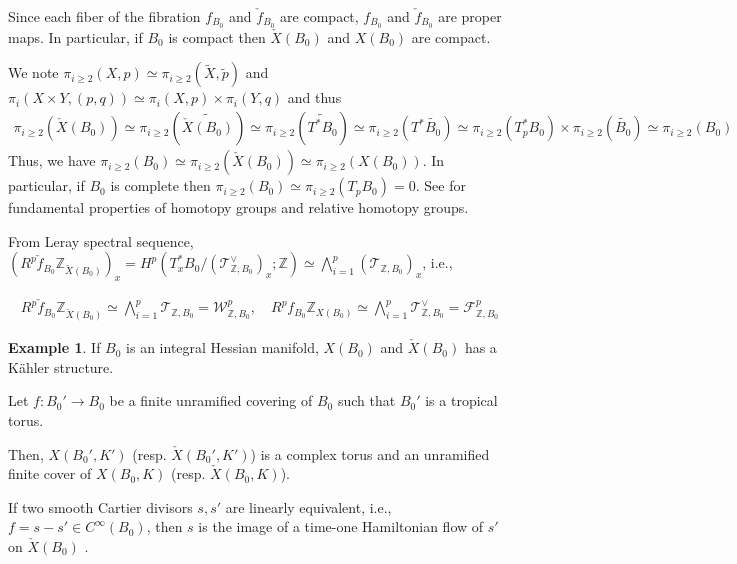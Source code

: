 \documentclass[a4paper,dvipdfmx,reqno,12pt]{amsart}
\theoremstyle{definition}
\newtheorem{Eg}[Thm]{Example}
\newcommand{\Z}{\mathbb{Z}}%
\newcommand{\mcal}[1]{\mathcal{#1}}%
\newcommand{\TBZ}{\mcal{T}_{\Z,B_0}}
\numberwithin{equation}{section}
\begin{document}
Since each fiber of the fibration $f_{B_0}$ and $\check{f}_{B_0}$ are compact, $f_{B_0}$ and $\check{f}_{B_0}$ are proper maps. In particular, if $B_0$ is compact then $\check{X}(B_0)$ and $X(B_0)$ are compact.



We note $\pi_{i\geq 2}(X,p)\simeq \pi_{i\geq 2}(\widetilde{X},\tilde{p})$ and $\pi_{i}(X\times Y,(p,q))\simeq \pi_i(X,p)\times \pi_i(Y,q)$ and thus
\begin{align}
  \pi_{i\geq 2}(\check{X}(B_0))\simeq \pi_{i\geq 2}(\widetilde{\check{X}(B_0)})\simeq \pi_{i\geq 2}(\widetilde{T^{*}B_0})\simeq \pi_{i\geq 2}(T^{*}\widetilde{B_0})\simeq  \pi_{i\geq 2}(T_p^* B_0)\times \pi_{i\geq 2}(\widetilde{B_0})\simeq \pi_{i\geq 2}(B_0)
\end{align}
Thus, we have $\pi_{i\geq 2}(B_0)\simeq \pi_{i\geq 2}(\check{X}(B_0))\simeq \pi_{i\geq 2}(X(B_0))$. In particular, if $B_0$ is complete then $\pi_{i\geq 2}(B_0)\simeq \pi_{i\geq 2}(T_{p}B_0)=0$. See \cite[Chapter 4]{hatcherAlgebraicTopology2002a} for fundamental properties of homotopy groups and relative homotopy groups.

From Leray spectral sequence, $(R^{p}\check{f}_{B_0}\Z_{\check{X}(B_0)})_{x}=H^{p}(T^{*}_xB_0/(\TBZ^{\vee})_x;\Z)\simeq \bigwedge_{i=1}^{p}(\TBZ)_{x}$, i.e.,

\begin{align}
  R^{p}\check{f}_{B_0}\Z_{\check{X}(B_0)}\simeq \bigwedge_{i=1}^{p} \TBZ=\mcal{W}^{p}_{\Z,B_0}, \quad R^{p}f_{B_0}\Z_{X(B_0)}\simeq \bigwedge_{i=1}^{p} \TBZ^{\vee}=\mcal{F}_{\Z,B_0}^{p}
\end{align}



\begin{Eg}
If $B_0$ is an integral Hessian manifold, 
$X(B_0)$ and $\check{X}(B_0)$ has a K\"ahler structure.

Let $f:B_0' \to B_0$ be a finite unramified covering of $B_0$ such that $B_0'$ is a tropical torus.

Then, $X(B_0',K')$ (resp. $\check{X}(B_0',K')$) 
is a complex torus and an unramified finite cover 
of $X(B_0,K)$ (resp. $\check{X}(B_0,K)$).

\end{Eg}
If two smooth Cartier divisors $s,s'$ are linearly equivalent, 
i.e., $f=s-s'\in C^{\infty}(B_0)$, 
then $s$ is the image of a time-one Hamiltonian flow of $s'$
on $\check{X}(B_0)$
\cite[Exercise 6.65]{aspinwallDirichletBranesMirror2009}.




\printindex
\end{document}
